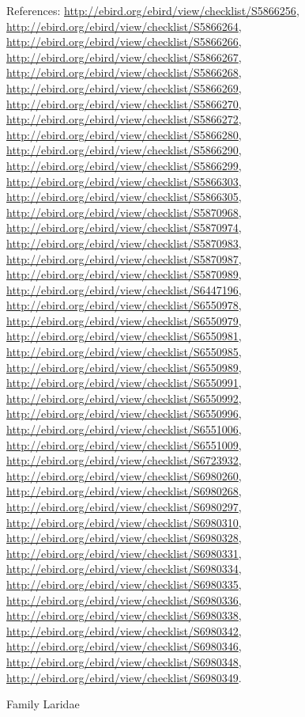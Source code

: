 \documentclass[9pt, article]{memoir}
\begin{document}
\begin{multicols}{2}
References: 
\url{http://ebird.org/ebird/view/checklist/S5866256}, 
\url{http://ebird.org/ebird/view/checklist/S5866264}, 
\url{http://ebird.org/ebird/view/checklist/S5866266}, 
\url{http://ebird.org/ebird/view/checklist/S5866267}, 
\url{http://ebird.org/ebird/view/checklist/S5866268}, 
\url{http://ebird.org/ebird/view/checklist/S5866269}, 
\url{http://ebird.org/ebird/view/checklist/S5866270}, 
\url{http://ebird.org/ebird/view/checklist/S5866272}, 
\url{http://ebird.org/ebird/view/checklist/S5866280}, 
\url{http://ebird.org/ebird/view/checklist/S5866290}, 
\url{http://ebird.org/ebird/view/checklist/S5866299}, 
\url{http://ebird.org/ebird/view/checklist/S5866303}, 
\url{http://ebird.org/ebird/view/checklist/S5866305}, 
\url{http://ebird.org/ebird/view/checklist/S5870968}, 
\url{http://ebird.org/ebird/view/checklist/S5870974}, 
\url{http://ebird.org/ebird/view/checklist/S5870983}, 
\url{http://ebird.org/ebird/view/checklist/S5870987}, 
\url{http://ebird.org/ebird/view/checklist/S5870989}, 
\url{http://ebird.org/ebird/view/checklist/S6447196}, 
\url{http://ebird.org/ebird/view/checklist/S6550978}, 
\url{http://ebird.org/ebird/view/checklist/S6550979}, 
\url{http://ebird.org/ebird/view/checklist/S6550981}, 
\url{http://ebird.org/ebird/view/checklist/S6550985}, 
\url{http://ebird.org/ebird/view/checklist/S6550989}, 
\url{http://ebird.org/ebird/view/checklist/S6550991}, 
\url{http://ebird.org/ebird/view/checklist/S6550992}, 
\url{http://ebird.org/ebird/view/checklist/S6550996}, 
\url{http://ebird.org/ebird/view/checklist/S6551006}, 
\url{http://ebird.org/ebird/view/checklist/S6551009}, 
\url{http://ebird.org/ebird/view/checklist/S6723932}, 
\url{http://ebird.org/ebird/view/checklist/S6980260}, 
\url{http://ebird.org/ebird/view/checklist/S6980268}, 
\url{http://ebird.org/ebird/view/checklist/S6980297}, 
\url{http://ebird.org/ebird/view/checklist/S6980310}, 
\url{http://ebird.org/ebird/view/checklist/S6980328}, 
\url{http://ebird.org/ebird/view/checklist/S6980331}, 
\url{http://ebird.org/ebird/view/checklist/S6980334}, 
\url{http://ebird.org/ebird/view/checklist/S6980335}, 
\url{http://ebird.org/ebird/view/checklist/S6980336}, 
\url{http://ebird.org/ebird/view/checklist/S6980338}, 
\url{http://ebird.org/ebird/view/checklist/S6980342}, 
\url{http://ebird.org/ebird/view/checklist/S6980346}, 
\url{http://ebird.org/ebird/view/checklist/S6980348}, 
\url{http://ebird.org/ebird/view/checklist/S6980349}.

\vspace{6pt}\noindent\hspace{24pt}Family Laridae



\end{multicols}
\end{document}
